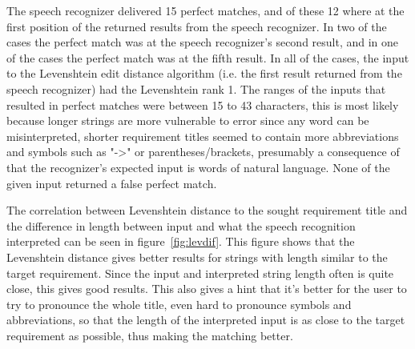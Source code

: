 \documentclass[conference]{IEEEtran}
\begin{document}
The speech recognizer delivered 15 perfect matches, and of these 12 where at the first position of the returned results from the speech recognizer. In two of the cases the perfect match was at the speech recognizer's second result, and in one of the cases the perfect match was at the fifth result. In all of the cases, the input to the Levenshtein edit distance algorithm (i.e. the first result returned from the speech recognizer) had the Levenshtein rank 1. The ranges of the inputs that resulted in perfect matches were between 15 to 43 characters, this is most likely because longer strings are more vulnerable to error since any word can be misinterpreted, shorter requirement titles seemed to contain more abbreviations and symbols such as "->" or parentheses/brackets, presumably a consequence of that the recognizer's expected input is words of natural language. None of the given input returned a false perfect match.


The correlation between Levenshtein distance to the sought requirement title and the difference in length between input and what the speech recognition interpreted can be seen in figure~\ref{fig:levdif}. This figure shows that the Levenshtein distance gives better results for strings with length similar to the target requirement. 
Since the input and interpreted string length often is quite close, this gives good results. 
This also gives a hint that it's better for the user to try to pronounce the whole title, even hard to pronounce symbols and abbreviations, so that the length of the interpreted input is as close to the target requirement as possible, thus making the matching better.

\end{document}

